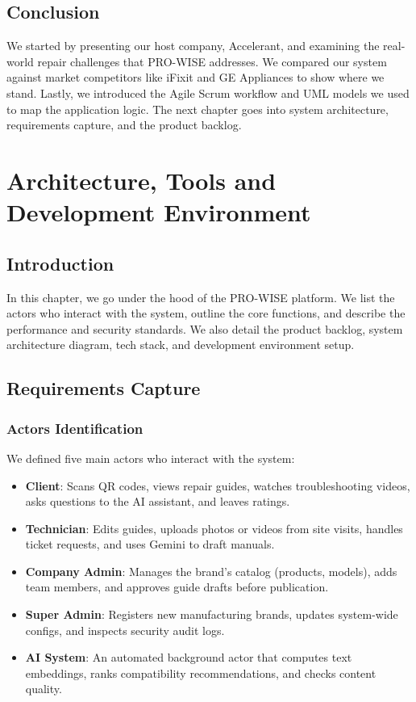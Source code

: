 \documentclass[12pt,a4paper]{report}
\begin{document}
\section{Conclusion}

We started by presenting our host company, Accelerant, and examining the real-world repair challenges that PRO-WISE addresses. We compared our system against market competitors like iFixit and GE Appliances to show where we stand. Lastly, we introduced the Agile Scrum workflow and UML models we used to map the application logic. The next chapter goes into system architecture, requirements capture, and the product backlog.

\chapter{Architecture, Tools and Development Environment}

\section{Introduction}

In this chapter, we go under the hood of the PRO-WISE platform. We list the actors who interact with the system, outline the core functions, and describe the performance and security standards. We also detail the product backlog, system architecture diagram, tech stack, and development environment setup.

\section{Requirements Capture}

\subsection{Actors Identification}

We defined five main actors who interact with the system:

\begin{itemize}
    \item \textbf{Client}: Scans QR codes, views repair guides, watches troubleshooting videos, asks questions to the AI assistant, and leaves ratings.
    \item \textbf{Technician}: Edits guides, uploads photos or videos from site visits, handles ticket requests, and uses Gemini to draft manuals.
    \item \textbf{Company Admin}: Manages the brand's catalog (products, models), adds team members, and approves guide drafts before publication.
    \item \textbf{Super Admin}: Registers new manufacturing brands, updates system-wide configs, and inspects security audit logs.
    \item \textbf{AI System}: An automated background actor that computes text embeddings, ranks compatibility recommendations, and checks content quality.
\end{itemize}
\end{document}
